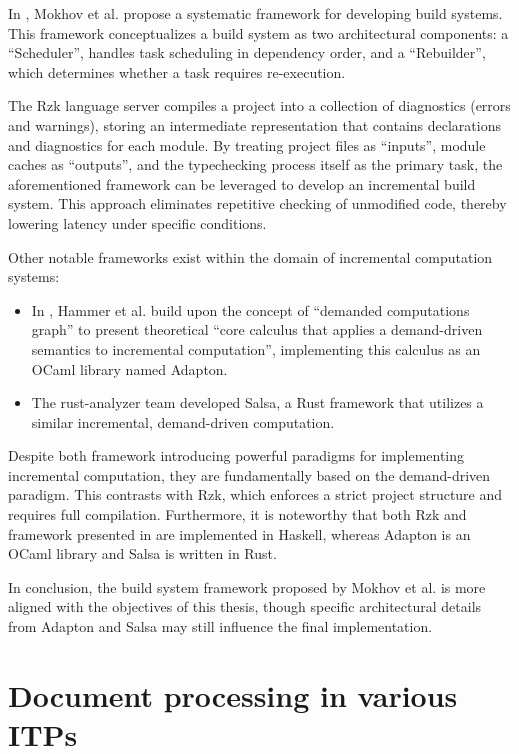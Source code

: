 In \cite{lacarte}, Mokhov et al. propose a systematic framework for developing build systems.
This framework conceptualizes a build system as two architectural components:
a \enquote{Scheduler}, handles task scheduling in dependency order,
and a \enquote{Rebuilder}, which determines whether a task requires re-execution.

The Rzk language server compiles a project into a collection of diagnostics (errors and warnings),
storing an intermediate representation that contains declarations and diagnostics for each module.
By treating project files as \enquote{inputs}, module caches as \enquote{outputs},
and the typechecking process itself as the primary task,
the aforementioned framework can be leveraged to develop an incremental build system.
This approach eliminates repetitive checking of unmodified code,
thereby lowering latency under specific conditions.

Other notable frameworks exist within the domain of incremental computation systems:
\begin{itemize}
	\item In \cite{adapton}, Hammer et al. build upon the concept of \enquote{demanded computations graph}
	to present theoretical \enquote{core calculus that applies a demand-driven semantics to incremental computation},
	implementing this calculus as an OCaml library named Adapton.
	\item The rust-analyzer team developed Salsa\cite{salsa}, a Rust framework
	that utilizes a similar incremental, demand-driven computation.
\end{itemize}

Despite both framework introducing powerful paradigms for implementing incremental computation,
they are fundamentally based on the demand-driven paradigm\cite{reportonsalsaadapton}.
This contrasts with Rzk, which enforces a strict project structure and requires full compilation.
Furthermore, it is noteworthy that both Rzk and framework presented in \cite{lacarte} are implemented in Haskell,
whereas Adapton is an OCaml library and Salsa is written in Rust.

In conclusion, the build system framework proposed by Mokhov et al.
is more aligned with the objectives of this thesis,
though specific architectural details from Adapton and Salsa may still influence the final implementation.

\section{Document processing in various ITPs}
\label{lr:itps}

